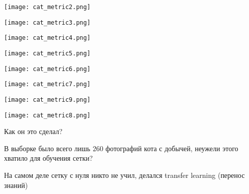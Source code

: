 \documentclass[notes,12pt, aspectratio=169]{beamer}
\newenvironment{wideitemize}{\itemize\addtolength{\itemsep}{10pt}}{\enditemize}
\begin{document}
\begin{frame}
\begin{center}
\texttt{[image: cat\_metric2.png]}
\end{center}
\end{frame}


\begin{frame}
\begin{center}
\texttt{[image: cat\_metric3.png]}
\end{center}
\end{frame}


\begin{frame}
\begin{center}
\texttt{[image: cat\_metric4.png]}
\end{center}
\end{frame}


\begin{frame}
\begin{center}
\texttt{[image: cat\_metric5.png]}
\end{center}
\end{frame}


\begin{frame}
\begin{center}
\texttt{[image: cat\_metric6.png]}
\end{center}
\end{frame}


\begin{frame}
\begin{center}
\texttt{[image: cat\_metric7.png]}
\end{center}
\end{frame}


\begin{frame}
\begin{center}
\texttt{[image: cat\_metric9.png]}
\end{center}
\end{frame}


\begin{frame}
\begin{center}
\texttt{[image: cat\_metric8.png]}
\end{center}
\end{frame}


\begin{frame}{Как он это сделал?}
\begin{wideitemize}
	\item   В выборке было всего лишь $260$ фотографий кота с добычей, неужели этого хватило для обучения сетки? 
	
	\item  На самом деле сетку с нуля никто не учил, делался \alert{transfer learning (перенос знаний)}
\end{wideitemize}
\end{frame}
\end{document}
